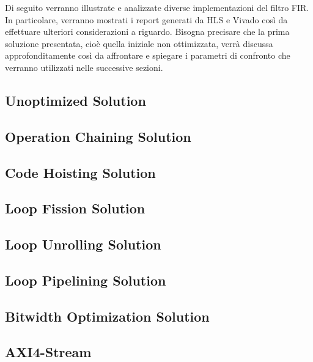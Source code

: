 Di seguito verranno illustrate e analizzate diverse implementazioni del filtro FIR. In particolare, verranno mostrati i report generati da HLS e Vivado così da effettuare ulteriori considerazioni a riguardo. Bisogna precisare che la prima soluzione presentata, cioè quella iniziale non ottimizzata, verrà discussa approfonditamente così da affrontare e spiegare i parametri di confronto che verranno utilizzati nelle successive sezioni.

\subsection{Unoptimized Solution}

\newpage

\subsection{Operation Chaining Solution}

\newpage

\subsection{Code Hoisting Solution}

\newpage

\subsection{Loop Fission Solution}

\newpage

\subsection{Loop Unrolling Solution}

\newpage

\subsection{Loop Pipelining Solution}

\newpage

\subsection{Bitwidth Optimization Solution}


\subsection{AXI4-Stream}
